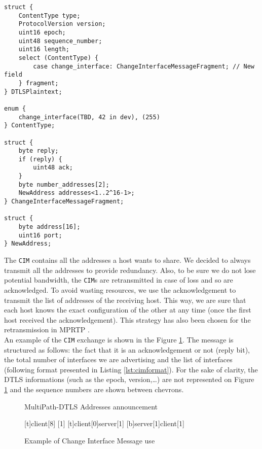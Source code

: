 \begin{lstlisting}[caption=Change Interface Message, label=lst:cimformat]
struct {
    ContentType type;
    ProtocolVersion version;
    uint16 epoch;
    uint48 sequence_number;
    uint16 length;
    select (ContentType) {
        case change_interface: ChangeInterfaceMessageFragment; // New field
    } fragment;
} DTLSPlaintext;

enum {
    change_interface(TBD, 42 in dev), (255)
} ContentType;

struct {
    byte reply;
    if (reply) {
        uint48 ack;
    }
    byte number_addresses[2];
    NewAddress addresses<1..2^16-1>;
} ChangeInterfaceMessageFragment;

struct {
    byte address[16];
    uint16 port;
} NewAddress;
\end{lstlisting}

The \texttt{CIM} contains all the addresses a host wants to share. We decided to always transmit all the addresses to provide redundancy. Also, to be sure we do not lose potential bandwidth, the \texttt{CIM}s are retransmitted in case of loss and so are acknowledged. To avoid wasting resources, we use the acknowledgement to transmit the list of addresses of the receiving host. This way, we are sure that each host knows the exact configuration of the other at any time (once the first host received the acknowledgement). This strategy has also been chosen for the retransmission in MPRTP \cite{singh-avtcore-mprtp}.\\

An example of the \texttt{CIM} exchange is shown in the Figure \ref{fig:CIMexchange}. The message is structured as follows: the fact that it is an acknowledgement or not (reply bit), the total number of interfaces we are advertising and the list of interfaces (following format presented in Listing \ref{lst:cimformat}). For the sake of clarity, the DTLS informations (such as the epoch, version,\dots) are not represented on Figure \ref{fig:CIMexchange} and the sequence numbers are shown between chevrons.

\begin{figure}[!h]
\centering
\begin{msc}[r]{MultiPath-DTLS Addresses announcement}

\setlength{\instfootheight}{0em}
\setlength{\instheadheight}{0em}
\setlength{\instdist}{0.7\linewidth}
\setlength{\levelheight}{3em}


[t]{}{client}[8]
[1]
\nextlevel
{}[t]{client}[0]{server}[1]
\nextlevel
{}[b]{server}[1]{client}[1]
\nextlevel
\nextlevel

\end{msc}
\caption{Example of Change Interface Message use}
\label{fig:CIMexchange}
\end{figure}

